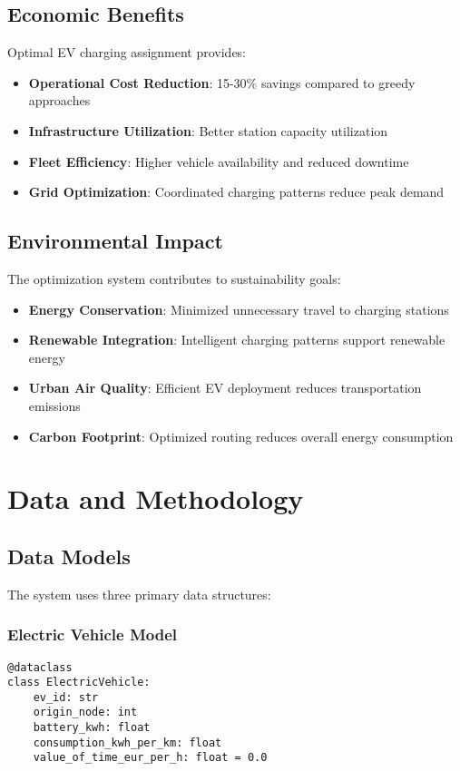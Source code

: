 \documentclass[12pt,a4paper]{article}
\begin{document}
\subsection{Economic Benefits}

Optimal EV charging assignment provides:
\begin{itemize}
    \item \textbf{Operational Cost Reduction}: 15-30\% savings compared to greedy approaches
    \item \textbf{Infrastructure Utilization}: Better station capacity utilization
    \item \textbf{Fleet Efficiency}: Higher vehicle availability and reduced downtime
    \item \textbf{Grid Optimization}: Coordinated charging patterns reduce peak demand
\end{itemize}

\subsection{Environmental Impact}

The optimization system contributes to sustainability goals:
\begin{itemize}
    \item \textbf{Energy Conservation}: Minimized unnecessary travel to charging stations
    \item \textbf{Renewable Integration}: Intelligent charging patterns support renewable energy
    \item \textbf{Urban Air Quality}: Efficient EV deployment reduces transportation emissions
    \item \textbf{Carbon Footprint}: Optimized routing reduces overall energy consumption
\end{itemize}

\section{Data and Methodology}

\subsection{Data Models}

The system uses three primary data structures:

\subsubsection{Electric Vehicle Model}
\begin{lstlisting}[caption=Electric Vehicle Data Structure]
@dataclass
class ElectricVehicle:
    ev_id: str
    origin_node: int
    battery_kwh: float
    consumption_kwh_per_km: float
    value_of_time_eur_per_h: float = 0.0
\end{lstlisting}
\end{document}
